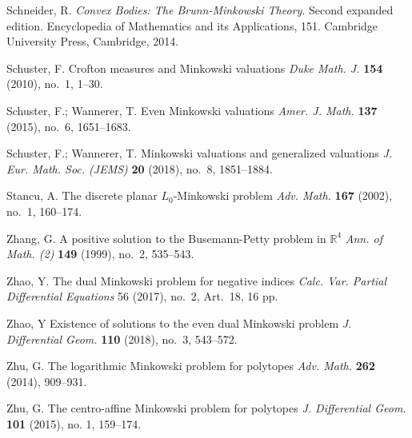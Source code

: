 \documentclass{cpamart1}     %
\theoremstyle{definition}
\theoremstyle{remark}
\newcommand{\rbo}{\mathbb R}
\begin{document}
\begin{thebibliography}{99}
Schneider, R.
\textit{Convex Bodies: The Brunn-Minkowski Theory}. Second expanded edition. Encyclopedia of Mathematics and its Applications, 151. Cambridge University Press, Cambridge, 2014.


Schuster, F.
Crofton measures and Minkowski valuations
\textit{Duke Math. J.}
\textbf{154} (2010), no.\ 1, 1--30.

Schuster, F.; Wannerer, T.
Even Minkowski valuations
\textit{Amer. J. Math.}
\textbf{137} (2015), no.\ 6, 1651--1683.

Schuster, F.; Wannerer, T.
Minkowski valuations and generalized valuations
\textit{J. Eur. Math. Soc. (JEMS)} 
\textbf{20} (2018), no.\ 8, 1851--1884.

Stancu, A.
The discrete planar $L_0$-Minkowski problem
\textit{Adv. Math.} \textbf{167} (2002), no.\ 1, 160--174.

Zhang, G. 
A positive solution to the Busemann-Petty problem in $\rbo^4$
\textit{Ann. of Math. (2)} 
\textbf{149} (1999),  no.\ 2, 535--543.

Zhao, Y.
The dual Minkowski problem for negative indices
\textit{Calc. Var. Partial Differential Equations} 56 (2017), no.\ 2, Art.\ 18, 16 pp.


Zhao, Y
Existence of solutions to the even dual Minkowski problem
\textit{J. Differential Geom.}
\textbf{110} (2018), no.\ 3, 543--572.

Zhu, G.
The logarithmic Minkowski problem for polytopes
\textit{Adv. Math.} 
\textbf{262} (2014), 909--931.

Zhu, G.
The centro-affine Minkowski problem for polytopes
\textit{J. Differential Geom.} \textbf{101} (2015), no. 1, 159--174.

\end{thebibliography}



                                
\end{document}
